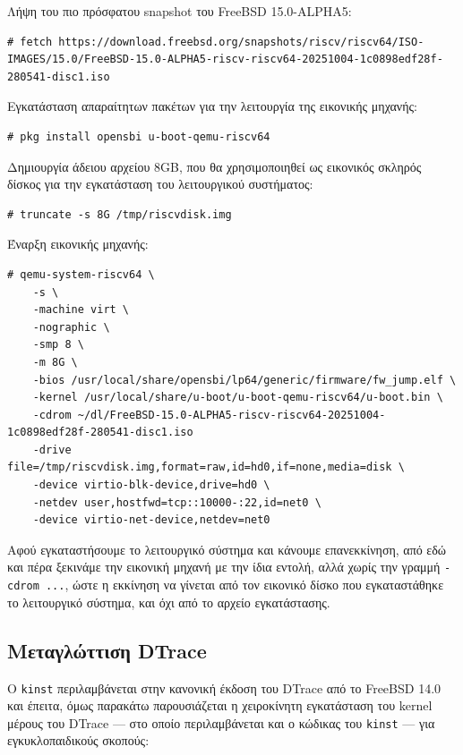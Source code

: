 \documentclass[12pt]{article}
\begin{document}
Λήψη του πιο πρόσφατου snapshot του FreeBSD 15.0-ALPHA5:

\begin{lstlisting}
# fetch https://download.freebsd.org/snapshots/riscv/riscv64/ISO-IMAGES/15.0/FreeBSD-15.0-ALPHA5-riscv-riscv64-20251004-1c0898edf28f-280541-disc1.iso
\end{lstlisting}

Εγκατάσταση απαραίτητων πακέτων για την λειτουργία της εικονικής μηχανής:

\begin{lstlisting}
# pkg install opensbi u-boot-qemu-riscv64
\end{lstlisting}

Δημιουργία άδειου αρχείου 8GB, που θα χρησιμοποιηθεί ως εικονικός σκληρός
δίσκος για την εγκατάσταση του λειτουργικού συστήματος:

\begin{lstlisting}
# truncate -s 8G /tmp/riscvdisk.img
\end{lstlisting}

Έναρξη εικονικής μηχανής:

\begin{lstlisting}
# qemu-system-riscv64 \
	-s \
	-machine virt \
	-nographic \
	-smp 8 \
	-m 8G \
	-bios /usr/local/share/opensbi/lp64/generic/firmware/fw_jump.elf \
	-kernel /usr/local/share/u-boot/u-boot-qemu-riscv64/u-boot.bin \
	-cdrom ~/dl/FreeBSD-15.0-ALPHA5-riscv-riscv64-20251004-1c0898edf28f-280541-disc1.iso
	-drive file=/tmp/riscvdisk.img,format=raw,id=hd0,if=none,media=disk \
	-device virtio-blk-device,drive=hd0 \
	-netdev user,hostfwd=tcp::10000-:22,id=net0 \
	-device virtio-net-device,netdev=net0
\end{lstlisting}

Αφού εγκαταστήσουμε το λειτουργικό σύστημα και κάνουμε επανεκκίνηση, από εδώ
και πέρα ξεκινάμε την εικονική μηχανή με την ίδια εντολή, αλλά χωρίς την γραμμή
\lstinline{-cdrom ...}, ώστε η εκκίνηση να γίνεται από τον εικονικό δίσκο που
εγκαταστάθηκε το λειτουργικό σύστημα, και όχι από το αρχείο εγκατάστασης.

\subsection{Μεταγλώττιση DTrace}

Ο \lstinline{kinst} περιλαμβάνεται στην κανονική έκδοση του DTrace από το
FreeBSD 14.0 και έπειτα, όμως παρακάτω παρουσιάζεται η χειροκίνητη εγκατάσταση
του kernel μέρους του DTrace --- στο οποίο περιλαμβάνεται και ο κώδικας του
\lstinline{kinst} --- για εγκυκλοπαιδικούς σκοπούς:
\end{document}

